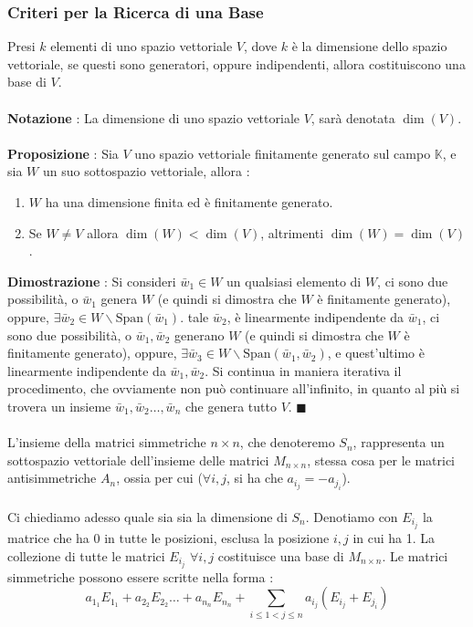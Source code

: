 \documentclass[12pt, letterpaper]{article}
\newcommand{\acc}{\\\hphantom{}\\}
\newcommand{\Span}{{\text{Span}}}
\begin{document}
\subsubsection{Criteri per la Ricerca di una Base}
Presi \(k\) elementi di uno spazio vettoriale \(V\), dove \(k\) è la 
dimensione dello spazio vettoriale, se questi sono generatori, oppure indipendenti, 
allora costituiscono una base di \(V\).\acc 
\textbf{Notazione }: La dimensione di uno spazio vettoriale \(V\), sarà denotata \(\dim(V)\).
\acc
\textbf{Proposizione }: Sia \(V\) uno spazio vettoriale finitamente 
generato sul campo \(\mathbb{K}\), e sia \(W\) un suo 
sottospazio vettoriale, allora : \begin{enumerate}
    \item \(W\) ha una dimensione finita ed è finitamente generato. 
    \item Se \(W\ne V\) allora \(\dim(W)<\dim(V)\), altrimenti \(\dim(W)=\dim(V)\).
\end{enumerate}
\textbf{Dimostrazione} : Si consideri \(\bar w_1\in W\) un qualsiasi elemento di \(W\), ci sono due 
possibilità, o \(\bar w_1\) genera \(W\) (e quindi si dimostra che \(W\) è finitamente 
generato), oppure, \(\exists \bar w_2 \in W\backslash\Span(\bar w_1)\). tale \(\bar w_2\), è linearmente 
indipendente da \(\bar w_1\), ci sono due possibilità, o \(\bar w_1,\bar w_2\) generano \(W\) (e quindi si dimostra che \(W\) è finitamente 
generato), oppure, \(\exists \bar w_3 \in W\backslash\Span(\bar w_1,\bar w_2)\), e quest'ultimo è linearmente 
indipendente da \(\bar w_1,\bar w_2\). Si continua in maniera iterativa il procedimento, che ovviamente 
non può continuare all'infinito, in quanto al più si trovera un insieme \(\bar w_1,\bar w_2\dots,\bar w_n\) che 
genera tutto \(V\). \(\blacksquare\) \acc 
L'insieme della matrici simmetriche \(n\times n\), che denoteremo \(S_n\), rappresenta un sottospazio vettoriale 
dell'insieme delle matrici \(M_{n\times n}\), stessa cosa per le matrici antisimmetriche \(A_n\), ossia 
per cui (\(\forall i,j\), si ha che \(a_{i_j}=-a_{j_i}\)). 
\acc Ci chiediamo adesso quale sia sia la dimensione di \(S_n\). Denotiamo con \(E_{i_j}\) la matrice che 
ha 0 in tutte le posizioni, esclusa la posizione \(i,j\) in cui ha 1. La collezione di tutte le 
matrici \(E_{i_j}\) \(\forall i,j\) costituisce una base di \(M_{n\times n}\). Le matrici simmetriche 
possono essere scritte nella forma : \begin{equation}
    a_{1_1}E_{1_1}+a_{2_2}E_{2_2}\dots+a_{n_n}E_{n_n}+\sum_{i\le1<j\le n}a_{i_j}(E_{i_j}+E_{j_i})
\end{equation}
\end{document}
